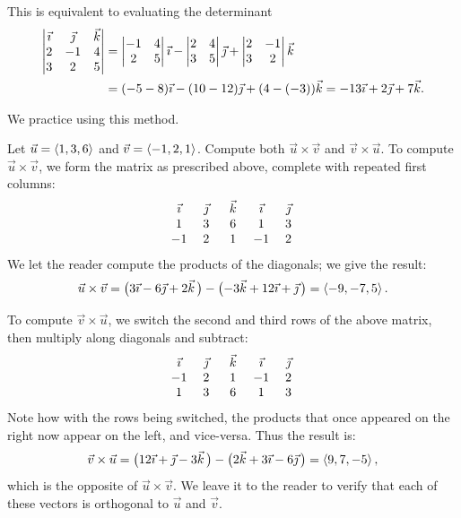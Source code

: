 This is equivalent to evaluating the determinant
\begin{align*}
 \begin{vmatrix}\vec\imath&\vec\jmath&\vec k\\2&-1&4\\3&2&5\end{vmatrix}
 &=\begin{vmatrix}-1&4\\2&5\end{vmatrix}\vec\imath
 -\begin{vmatrix}2&4\\3&5\end{vmatrix}\vec\jmath
 +\begin{vmatrix}2&-1\\3&2\end{vmatrix}\vec k \\
 &=(-5-8)\vec\imath-(10-12)\vec\jmath+(4-(-3))\vec k
 =-13\vec\imath+2\vec\jmath+7\vec k.
\end{align*}

We practice using this method.

\begin{example}\label{ex_crossp2}%
Let $\vec u=\left\langle 1,3,6\right\rangle$ and $\vec v = \left\langle -1,2,1\right\rangle$. Compute both $\vec u\times\vec v$ and $\vec v\times\vec u$.
\solution
To compute $\vec u\times\vec v$, we form the matrix as prescribed above, complete with repeated first columns:
\[\begin{array}{ c c c c c } \ \veci\ &\ \vecj\ &\ \veck\ &\ \veci\ &\ \vecj\ \\  1&3&6&1&3\\ -1&2&1&-1&2\end{array}\]
We let the reader compute the products of the diagonals; we give the result:
\[\vec u\times\vec v = \bigl(3\vec\imath-6\vec\jmath+2\vec k\,\bigr) - \bigl(-3\vec k + 12\vec\imath+\vec\jmath\,\bigr) = \left\langle -9,-7,5\right\rangle.\]

To compute $\vec v\times\vec u$, we switch the second and third rows of the above matrix, then multiply along diagonals and subtract:
%
\[\begin{array}{ c c c c c } \ \veci\ &\ \vecj\ &\ \veck\ &\ \veci\ &\ \vecj\ \\ -1&2&1&-1&2\\  1&3&6&1&3\end{array}\]
Note how with the rows being switched, the products that once appeared on the right now appear on the left, and vice-versa. Thus the result is:
\[\vec v\times\vec u = \bigl(12\vec\imath+\vec\jmath-3\vec k\,\bigr) - \bigl(2\vec k + 3\vec\imath-6\vec\jmath\,\bigr) = \left\langle 9,7,-5\right\rangle,\]
which is the opposite of $\vec u\times\vec v$. We leave it to the reader to verify that each of these vectors is orthogonal to $\vec u$ and $\vec v$.
\end{example}

